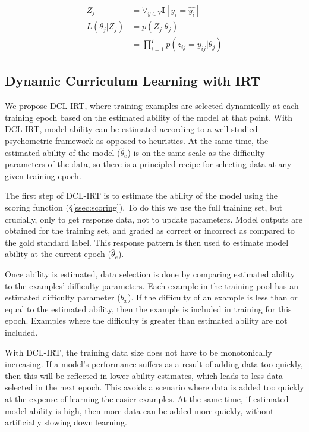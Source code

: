 \documentclass[letterpaper]{article} %
\begin{document}
\begin{align}
Z_j &= \forall_{y \in Y} \mathbf{I}[y_i = \hat{y_i}] \\
L(\theta_j \vert Z_j) &= p(Z_j \vert \theta_j)  \\
&= \prod_{i=1}^I p(z_{ij}=y_{ij} \vert \theta_j) 
\end{align}


\subsection{Dynamic Curriculum Learning with IRT}

We propose DCL-IRT, where training examples are selected dynamically at each training epoch based on the estimated ability of the model at that point.
With DCL-IRT, model ability can be estimated according to a well-studied psychometric framework as opposed to heuristics.
At the same time, the estimated ability of the model ($\hat{\theta}_e$) is on the same scale as the difficulty parameters of the data, so there is a principled recipe for selecting data at any given training epoch.


The first step of DCL-IRT is to estimate the ability of the model using the scoring function (\S \ref{ssec:scoring}). 
To do this we use the full training set, but crucially, only to get response data, not to update parameters. 
Model outputs are obtained for the training set, and graded as correct or incorrect as compared to the gold standard label. 
This response pattern is then used to estimate model ability at the current epoch ($\hat{\theta}_e$).

Once ability is estimated, data selection is done by comparing estimated ability to the examples' difficulty parameters.
Each example in the training pool has an estimated difficulty parameter ($b_x$).
If the difficulty of an example is less than or equal to the estimated ability, then the example is included in training for this epoch.
Examples where the difficulty is greater than estimated ability are not included.

With DCL-IRT, the training data size does not have to be monotonically increasing. If a model's performance suffers as a result of adding data too quickly, then this will be reflected in lower ability estimates, which leads to less data selected in the next epoch. 
This avoids a scenario where data is added too quickly at the expense of learning the easier examples.
At the same time, if estimated model ability is high, then more data can be added more quickly, without artificially slowing down learning.
\end{document}
